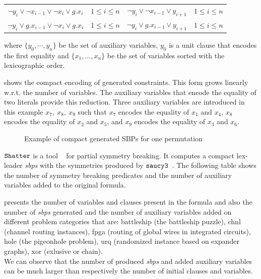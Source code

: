  
\begin{center}
\begin{tabular}{cc|cc}
 $\neg y_i \lor \neg x_{i-1} \lor \neg x_i \lor g.x_i$ & $1 \leq i \leq n$ & $ \neg y_i \lor \neg x_{i-1} \lor y_{i+1}$ & $1 \leq i \leq n$ \\
 $\neg y_i \lor  g.x_{i-1} \lor \neg x_i \lor g.x_i$ & $1 \leq i \leq n$ & $ \neg y_i \lor g.x_{i-1} \lor  y_{i+1}$ & $1 \leq i \leq n$ \\
 
\end{tabular}
\end{center}
where $\{y_0,\cdots, y_{n} \}$ be the set of auxiliary variables, $y_0$ is a unit clause that encodes the first equality and $\{x_1,...,x_n\}$ be the set of variables sorted with the lexicographic order.


 shows the compact encoding of generated constraints. This form grows linearly w.r.t. the number of variables.
The auxiliary variables that encode the equality of two literals provide this reduction. 
Three auxiliary variables are introduced in this example $x_7,\ x_8,\ x_9$ such that $x_7$ encodes the equality of $x_1$ and $x_4$, $x_8$ encodes the equality of $x_2$ and $x_5$, and $x_9$ encodes the equality of $x_3$ and $x_6$.

 \begin{figure}[!htbp]
 
 \caption{Example of compact generated SBPs for one permutation}
 \label{fig:esbp_compact_gen}
\end{figure}

$\texttt{Shatter}$ is a tool ~\cite{aloul06} for partial symmetry breaking.
It computes a compact lex-leader \textit{sbps} with the symmetries produced by $\texttt{saucy3}$~\cite{katebi2010symmetry}.
The following table shows the number of symmetry breaking predicates and the
number of auxiliary variables added to the original formula.




 presents the number of variables and clauses present in the formula and also the  
number of \textit{sbps} generated and the number of auxiliary variables added on different problem categories that are:
battleship (the battleship puzzle), chnl (channel routing instances), fpga (routing of global wires in integrated circuits),
 hole (the pigeonhole problem), urq (randomized instance based on expander graphs), xor (exlusive or chain).\\
We can observe that the number of produced \textit{sbps} and added auxiliary variables can be much larger than
respectively the number of initial clauses and variables.


